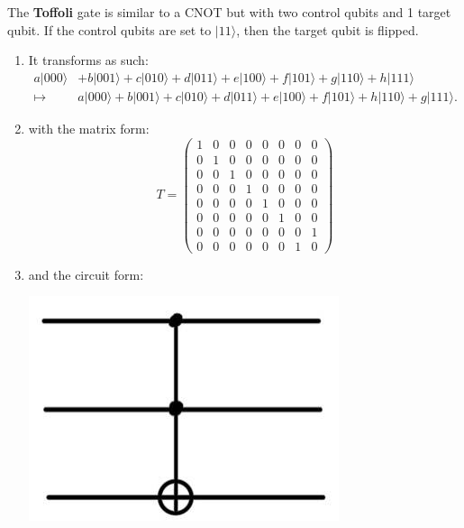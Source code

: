 \documentclass{article}
\begin{document}
    \begin{definition}[Toffoli]
      The \textbf{Toffoli} gate is similar to a CNOT but with two control qubits and 1 target qubit. If the control qubits are set to $|11\rangle$, then the target qubit is flipped.
      \begin{enumerate} 
        \item It transforms as such: 
          \begin{align*}
            a|000\rangle & + b|001\rangle + c|010\rangle + d |011\rangle + e|100\rangle + f |101\rangle + g|110\rangle + h|111\rangle \\
            \mapsto & a|000\rangle + b|001\rangle + c|010\rangle + d |011\rangle + e|100\rangle + f |101\rangle + h|110\rangle + g|111\rangle.
          \end{align*}
        \item with the matrix form: 
          \begin{equation} 
            T = \begin{pmatrix} 1&0&0&0&0&0&0&0\\ 0&1&0&0&0&0&0&0\\ 0&0&1&0&0&0&0&0\\ 0&0&0&1&0&0&0&0\\ 0&0&0&0&1&0&0&0\\ 0&0&0&0&0&1&0&0\\ 0&0&0&0&0&0&0&1\\ 0&0&0&0&0&0&1&0 \end{pmatrix}
          \end{equation}
        \item and the circuit form: 
          \begin{center}
            \includegraphics[scale=0.3]{img/Toffoli_gate.jpg}
          \end{center}
      \end{enumerate}
    \end{definition}
    
\end{document}

